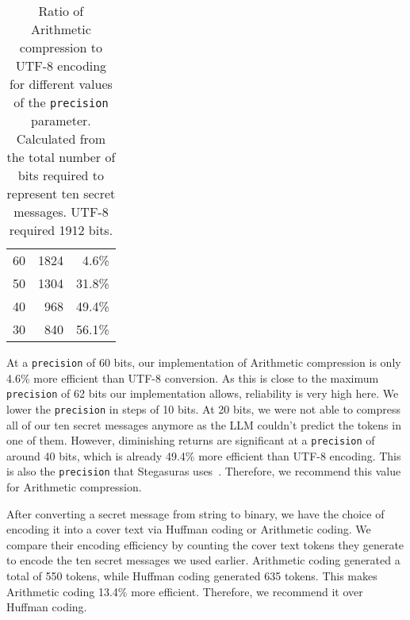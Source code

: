 \begin{table}
	\centering
	\begin{tabular}{@{} p{2.5cm} rr @{}} %
		\toprule
		\tableheadline{Precision} & \tableheadline{Bits} & \tableheadline{Ratio} \\
        \midrule
        60                        &                 1824 &                 4.6\% \\
		50                        &                 1304 &                31.8\% \\
        40                        &                  968 &                49.4\% \\
        30                        &                  840 &                56.1\% \\
		\bottomrule
	\end{tabular}
	\caption[Compression measurements]{Ratio of Arithmetic compression to UTF-8 encoding for different values of the \lstinline|precision| parameter. Calculated from the total number of bits required to represent ten secret messages. UTF-8 required 1912 bits.}
	\label{tab:compression}
\end{table}

At a \lstinline|precision| of 60 bits, our implementation of Arithmetic compression is only 4.6\% more efficient than UTF-8 conversion. As this is close to the maximum \lstinline|precision| of 62 bits our implementation allows, reliability is very high here. We lower the \lstinline|precision| in steps of 10 bits. At 20 bits, we were not able to compress all of our ten secret messages anymore as the \gls{LLM} couldn't predict the tokens in one of them. However, diminishing returns are significant at a \lstinline|precision| of around 40 bits, which is already 49.4\% more efficient than UTF-8 encoding. This is also the \lstinline|precision| that Stegasuras uses~\cite{zieglerHarvardnlpNeuralSteganography2025}. Therefore, we recommend this value for Arithmetic compression.

After converting a secret message from string to binary, we have the choice of encoding it into a cover text via Huffman coding or Arithmetic coding. We compare their encoding efficiency by counting the cover text tokens they generate to encode the ten secret messages we used earlier. Arithmetic coding generated a total of 550 tokens, while Huffman coding generated 635 tokens. This makes Arithmetic coding 13.4\% more efficient. Therefore, we recommend it over Huffman coding.

